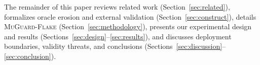 The remainder of this paper reviews related work (Section~\ref{sec:related}), formalizes oracle erosion and external validation (Section~\ref{sec:construct}), details \textsc{MuGuard-Flake} (Section~\ref{sec:methodology}), presents our experimental design and results (Sections~\ref{sec:design}--\ref{sec:results}), and discusses deployment boundaries, validity threats, and conclusions (Sections~\ref{sec:discussion}--\ref{sec:conclusion}).
